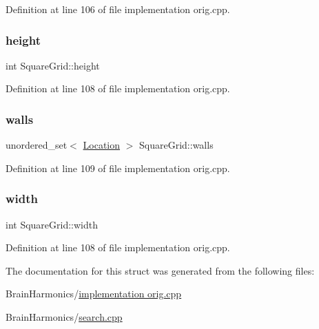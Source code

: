 Definition at line 106 of file implementation orig.\+cpp.

\mbox{\label{struct_square_grid_ad6b113fc3a49f5db5fbf9c8138e35634}} 
\subsubsection{\texorpdfstring{height}{height}}
{\footnotesize\ttfamily int Square\+Grid\+::height}



Definition at line 108 of file implementation orig.\+cpp.

\mbox{\label{struct_square_grid_a1bc7e32bd195e42fd9685310d7ee65c5}} 
\subsubsection{\texorpdfstring{walls}{walls}}
{\footnotesize\ttfamily unordered\+\_\+set$<$ \hyperlink{struct_square_grid_a2c9a2cbd3912aa48ac97289abc3f1c0f}{Location} $>$ Square\+Grid\+::walls}



Definition at line 109 of file implementation orig.\+cpp.

\mbox{\label{struct_square_grid_af5476cf49f0bb03d1e940adbc6e5febf}} 
\subsubsection{\texorpdfstring{width}{width}}
{\footnotesize\ttfamily int Square\+Grid\+::width}



Definition at line 108 of file implementation orig.\+cpp.



The documentation for this struct was generated from the following files\+:\begin{DoxyCompactItemize}
\item 
Brain\+Harmonics/\hyperlink{implementation_01orig_8cpp}{implementation orig.\+cpp}\item 
Brain\+Harmonics/\hyperlink{search_8cpp}{search.\+cpp}\end{DoxyCompactItemize}
